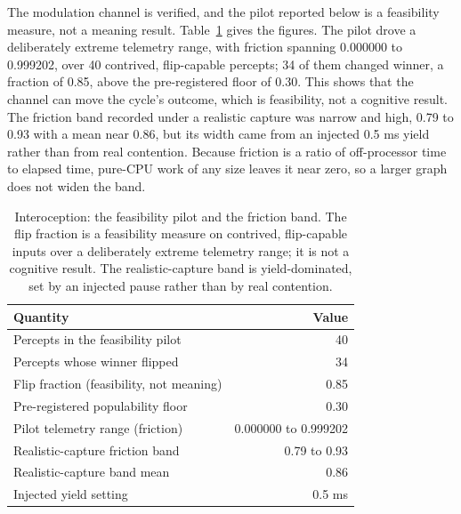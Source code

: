\documentclass[11pt]{article}
\begin{document}
The modulation channel is verified, and the pilot reported below is a feasibility measure,
not a meaning result. Table~\ref{tab:interoception} gives the figures. The pilot drove a
deliberately extreme telemetry range, with friction spanning 0.000000 to 0.999202, over 40
contrived, flip-capable percepts; 34 of them changed winner, a fraction of 0.85, above the
pre-registered floor of 0.30. This shows that the channel can move the cycle's outcome,
which is feasibility, not a cognitive result. The friction band recorded under a realistic
capture was narrow and high, 0.79 to 0.93 with a mean near 0.86, but its width came from an
injected 0.5 ms yield rather than from real contention. Because friction is a ratio of
off-processor time to elapsed time, pure-CPU work of any size leaves it near zero, so a
larger graph does not widen the band.

\begin{table}[t]
  \centering
  \caption{Interoception: the feasibility pilot and the friction band. The flip fraction is
    a feasibility measure on contrived, flip-capable inputs over a deliberately extreme
    telemetry range; it is not a cognitive result. The realistic-capture band is
    yield-dominated, set by an injected pause rather than by real contention.}
  \label{tab:interoception}
  \small
  \begin{tabular}{@{}lr@{}}
    \toprule
    Quantity & Value \\
    \midrule
    Percepts in the feasibility pilot & 40 \\
    Percepts whose winner flipped & 34 \\
    Flip fraction (feasibility, not meaning) & 0.85 \\
    Pre-registered populability floor & 0.30 \\
    Pilot telemetry range (friction) & 0.000000 to 0.999202 \\
    Realistic-capture friction band & 0.79 to 0.93 \\
    Realistic-capture band mean & 0.86 \\
    Injected yield setting & 0.5 ms \\
    \bottomrule
  \end{tabular}
\end{table}


\end{document}
